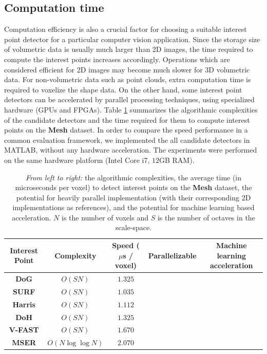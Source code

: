 \subsection{Computation time}
Computation efficiency is also a crucial factor for choosing a suitable interest point detector for a particular computer vision application. Since the storage size of volumetric data is usually much larger than 2D images, the time required to compute the interest points increases accordingly. Operations which are considered efficient for 2D images may become much slower for 3D volumetric data. For non-volumetric data such as point clouds, extra computation time is required to voxelize the shape data. On the other hand, some interest point detectors can be accelerated by parallel processing techniques, using specialized hardware (\eg GPUs and FPGAs). Table \ref{tab:speedtable} summarizes the algorithmic complexities of the candidate detectors and the time required for them to compute interest points on the \textbf{Mesh} dataset. In order to compare the speed performance in a common evaluation framework, we implemented the all candidate detectors in MATLAB, without any hardware acceleration. The experiments were performed on the same hardware platform (Intel Core i7, $12$GB RAM). 
\begin{table}
\centering
\begin{tabular}{c|cccc}
\hline
\textbf{Interest Point} & \textbf{Complexity} & \textbf{Speed ($\mu$s / voxel)} & \textbf{Parallelizable} & \textbf{Machine learning acceleration} \\
\hline
\textbf{DoG} 		& $O(SN)$ 			& $1.325 $ 			& \checkmark \cite{Sinha2006} & \\
\textbf{SURF} 		& $O(SN)$ 			& $1.035 $ 			& \checkmark \cite{Cornelis2008} & \\
\textbf{Harris} 	& $O(SN)$ 			& $1.112 $ 			& \checkmark \cite{Teixeira2008} & \\
\textbf{DoH} 		& $O(SN)$ 			& $1.325 $ 			& \checkmark \cite{Bhatia2007} \\
\textbf{V-FAST} 	& $O(SN)$ 			& $1.670 $ 			& \checkmark \cite{Dohi2011} & \checkmark \cite{Rosten2010}\\
\textbf{MSER} 		& $O(N\log\log N)$ 	& $2.070 $ 			& \checkmark \cite{Kristensen2007} &\\
\hline
\end{tabular}
\caption{\emph{From left to right:} the algorithmic complexities, the average time (in microseconds per voxel) to detect interest points on the \textbf{Mesh} dataset, the potential for heavily parallel implementation (with their corresponding 2D implementations as references), and the potential for machine learning based acceleration. $N$ is the number of voxels and $S$ is the number of octaves in the scale-space.}
\label{tab:speedtable}
\end{table}
